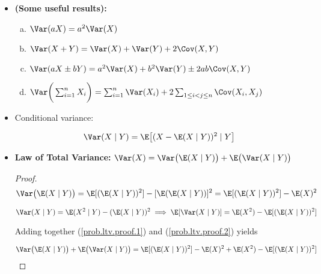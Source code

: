 \begin{itemize}
\begin{itemize}
\item \begin{theorem} \textbf{(Some useful results):} 


\begin{enumerate}[(a)]

\item \(\Var(aX) = a^2 \Var(X)\)

\item \(\Var(X + Y) = \Var(X) + \Var(Y) + 2 \Cov(X, Y)\)

\item \(\Var(aX \pm bY) = a^2\Var(X) + b^2\Var(Y) \pm 2ab \Cov(X, Y)\) 

\item \(\Var \bigg( \sum_{i=1}^n X_i \bigg) = \sum_{i=1}^n \Var(X_i) + 2 \sum_{1 \leq i < j \leq n} \Cov(X_i, X_j)\)

\end{enumerate}
\end{theorem}

\item \begin{definition} Conditional variance: 

\[
\Var(X \mid Y) = \E \big[ (X - \E(X \mid Y))^2 \mid Y \big]
\] 

\end{definition}

\item \begin{theorem}\label{prob.ltv} \textbf{Law of Total Variance:} \( \Var(X) = \Var \big( \E(X \mid Y) \big) + \E \big( \Var(X \mid Y) \big) \)\end{theorem}

\begin{proof}

\begin{equation}\label{prob.ltv.proof.1}
\Var \big( \E(X \mid Y) \big) =\E[( \E(X \mid Y))^2]  - [\E( \E(X \mid Y))]^2 =  \E[( \E(X \mid Y))^2] - \E(X)^2
\end{equation}

\begin{equation}\label{prob.ltv.proof.2}
\Var(X \mid Y) = \E(X^2 \mid Y) - ( \E(X \mid Y))^2 \implies \E[\Var(X \mid Y)] = \E(X^2) - \E[( \E(X \mid Y))^2]
\end{equation}

Adding together (\ref{prob.ltv.proof.1}) and (\ref{prob.ltv.proof.2}) yields

\[
\Var \big( \E(X \mid Y) \big) + \E \big( \Var(X \mid Y) \big) = \E[( \E(X \mid Y))^2]  - \E(X)^2 +  \E(X^2) - \E[( \E(X \mid Y))^2] 
\]


\end{proof}
\end{itemize}
\end{itemize}
